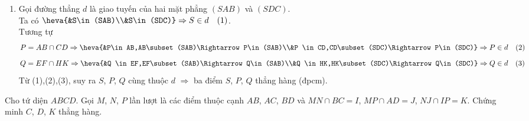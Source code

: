 \begin{bt}
\begin{bt}
{\begin{enumerate}
			Tương tự
			$$M=AD\cap BC \Rightarrow \heva{&M\in AD,AD\subset (SAD)\Rightarrow M\in(SAD)\\&M \in BC,BC\subset (SBC)\Rightarrow M\in(SBC)}\Rightarrow M\in d\quad (2)$$
			$$N=EK\cap FH \Rightarrow \heva{&N \in EK,EK\subset (SAD)\Rightarrow N\in(SAD)\\&N \in FH,FH\subset (SBC)\Rightarrow N\in(SBC)}\Rightarrow N\in d\quad (3)$$
			Từ (1),(2),(3), suy ra $S$, $M$, $N$ cùng thuộc $d$ $\Rightarrow$ ba điểm $S$, $M$, $N$ thẳng hàng (đpcm).
			\item Gọi đường thẳng $d$ là giao tuyến của hai mặt phẳng $(SAB)$ và $(SDC)$.\\
			Ta có 
			$\heva{&S\in(SAB)\\&S\in(SDC)}\Rightarrow S\in d\quad (1)$.\\
			Tương tự
			$$P=AB\cap CD \Rightarrow \heva{&P\in AB,AB\subset (SAB)\Rightarrow P\in(SAB)\\&P \in CD,CD\subset (SDC)\Rightarrow P\in(SDC)}\Rightarrow P\in d\quad (2)$$
			$$Q=EF\cap HK \Rightarrow \heva{&Q \in EF,EF\subset (SAB)\Rightarrow Q\in(SAB)\\&Q \in HK,HK\subset (SDC)\Rightarrow Q\in(SDC)}\Rightarrow Q\in d\quad (3)$$
			Từ (1),(2),(3), suy ra $S$, $P$, $Q$ cùng thuộc $d$ $\Rightarrow$ ba điểm $S$, $P$, $Q$ thẳng hàng (đpcm).
		\end{enumerate}	
	}
\end{bt}
\begin{bt}%
	Cho tứ diện $ABCD$. Gọi $M$, $N$, $P$ lần lượt là các điểm thuộc cạnh $AB$, $AC$, $BD$ và $MN\cap BC=I$, $MP\cap AD=J$, $NJ\cap IP=K$. Chứng minh $C$, $D$, $K$ thẳng hàng.
\end{bt}
\end{bt}
